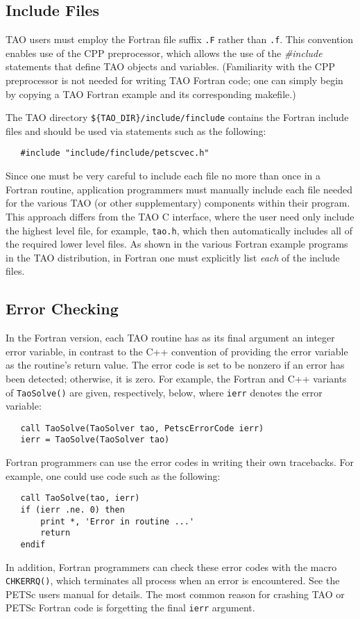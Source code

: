 \subsection{Include Files}
\label{sec:fortran_includes}

TAO users must employ the Fortran file suffix {\tt .F}
rather than {\tt .f}.  This convention enables use of the CPP
preprocessor, which allows the use of the {\em \#include} statements
that define TAO objects and variables. (Familiarity with the CPP
preprocessor is not needed for writing TAO Fortran code; one can
simply begin by copying a TAO Fortran example and its corresponding
makefile.)  

The TAO directory {\tt \$\{TAO\_DIR\}/include/finclude}
contains the Fortran include files
and should be used via statements 
such as the following:
\begin{verbatim}
   #include "include/finclude/petscvec.h"
\end{verbatim}
\noindent
Since one must be very careful to include each file no more than once
in a Fortran routine, application programmers must manually include
each file needed for the various TAO (or other supplementary)
components within their program.  This approach differs from the TAO
C interface, where the user need only include the highest level
file, for example, {\tt tao.h}, which then automatically
includes all of the required lower level files.  As shown in the
various Fortran example programs in the TAO distribution, in Fortran
one must explicitly list {\em each} of the include files.


\subsection{Error Checking}
\label{sec:fortran_errors}

In the Fortran version, each TAO routine has as its final argument
an integer error variable, in contrast to the C++ convention of
providing the error variable as the routine's return value.  The error
code is set to be nonzero if an error has been detected; otherwise, it
is zero.  For example, the Fortran and C++ variants of {\tt TaoSolve()} are
given, respectively, below, where {\tt ierr} denotes the error variable:
\begin{verbatim}
   call TaoSolve(TaoSolver tao, PetscErrorCode ierr)
   ierr = TaoSolve(TaoSolver tao)
\end{verbatim}
\noindent

Fortran programmers can use the error codes in writing their own
tracebacks.  For example, one could use code such as the following:
\begin{verbatim}
   call TaoSolve(tao, ierr)
   if (ierr .ne. 0) then
       print *, 'Error in routine ...'
       return
   endif
\end{verbatim}
\noindent
In addition, Fortran programmers can check these error codes with the
macro {\tt CHKERRQ()}, which terminates all process when an error
is encountered.  See the PETSc users manual for details.  The most
common reason for crashing TAO or PETSc Fortran code is forgetting the final
{\tt ierr} argument.

